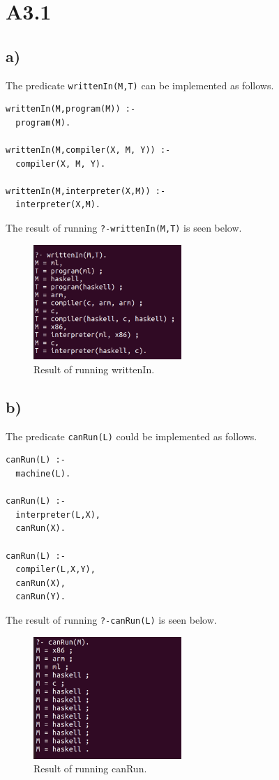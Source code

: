 \section*{A3.1}

\subsection*{a)}
The predicate \texttt{writtenIn(M,T)} can be implemented as follows.

\begin{verbatim}
writtenIn(M,program(M)) :-
  program(M).

writtenIn(M,compiler(X, M, Y)) :-
  compiler(X, M, Y).

writtenIn(M,interpreter(X,M)) :-
  interpreter(X,M).
\end{verbatim}

The result of running \texttt{?-writtenIn(M,T)} is seen below.
\begin{figure}[h]
\centering
\includegraphics[width=0.5\textwidth]{a31a.png}
\caption{Result of running writtenIn.}
\end{figure}

\subsection*{b)}
The predicate \texttt{canRun(L)} could be implemented as follows.

\begin{verbatim}
canRun(L) :-
  machine(L).

canRun(L) :-
  interpreter(L,X),
  canRun(X).

canRun(L) :-
  compiler(L,X,Y),
  canRun(X),
  canRun(Y).
\end{verbatim}

The result of running \texttt{?-canRun(L)} is seen below.
\begin{figure}[h]
\centering
\includegraphics[width=0.5\textwidth]{a31b.png}
\caption{Result of running canRun.}
\end{figure}

